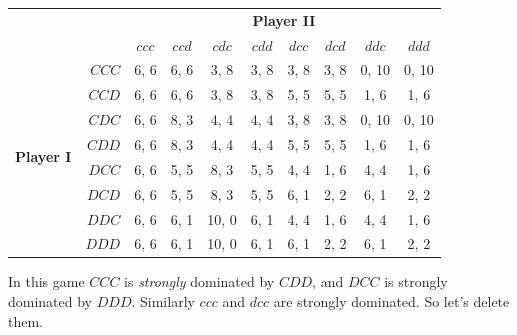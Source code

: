 \documentclass[openany]{book}
\begin{document}
\begin{center}
\begin{tabular}{l r | c c c c c c c c}
& & \multicolumn{8}{c}{\textbf{Player II}} \\
& & $ccc$ & $ccd$ & $cdc$ & $cdd$ & $dcc$ & $dcd$ & $ddc$ & $ddd$ \\ \hline
\multirow{8}{*}{\textbf{Player I}} 
& $CCC$ & 6, 6 & 6, 6 & 3, 8  & 3, 8  & 3, 8 & 3, 8 & 0, 10 & 0, 10\\
& $CCD$ & 6, 6 & 6, 6 & 3, 8  & 3, 8  & 5, 5 & 5, 5 & 1, 6 & 1, 6\\
& $CDC$ & 6, 6 & 8, 3 & 4, 4  & 4, 4  & 3, 8 & 3, 8 & 0, 10 & 0, 10\\
& $CDD$ & 6, 6 & 8, 3 & 4, 4  & 4, 4  & 5, 5 & 5, 5 & 1, 6 & 1, 6\\
& $DCC$ & 6, 6 & 5, 5 & 8, 3  & 5, 5  & 4, 4 & 1, 6 & 4, 4 & 1, 6\\
& $DCD$ & 6, 6 & 5, 5 & 8, 3  & 5, 5  & 6, 1 & 2, 2 & 6, 1 & 2, 2\\
& $DDC$ & 6, 6 & 6, 1 & 10, 0 & 6, 1 & 4, 4 & 1, 6 & 4, 4 & 1, 6\\
& $DDD$ & 6, 6 & 6, 1 & 10, 0 & 6, 1 & 6, 1 & 2, 2 & 6, 1 & 2, 2\\
\end{tabular}
\end{center}
In this game $CCC$ is \textit{strongly} dominated by $CDD$, and $DCC$ is strongly dominated by $DDD$. Similarly $ccc$ and $dcc$ are strongly dominated. So let's delete them.
\end{document}
